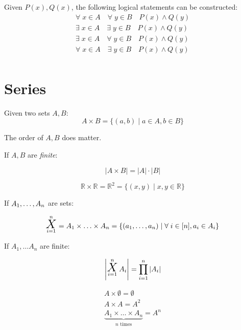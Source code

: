 \documentclass[00_complete]{subfiles}
\begin{document}
Given $P(x), Q(x)$, the following logical statements can be constructed:
\begin{gather*}
    \forall \; x \in A \quad \forall \; y \in B \quad P(x) \land Q(y) \\
    \exists \; x \in A \quad \exists \; y \in B \quad P(x) \land Q(y) \\
    \exists \; x \in A \quad \forall \; y \in B \quad P(x) \land Q(y) \\
    \forall \; x \in A \quad \exists \; y \in B \quad P(x) \land Q(y) \\
\end{gather*}

\section{Series}

\begin{definition}
Given two sets $A,B$:
$$A \times B = \{(a,b) \mid a \in A, b \in B\}$$
\begin{note}
The order of $A, B$ does matter.
\end{note}
\end{definition}

If $A, B$ are \emph{finite}:

$$|A \times B| = |A| \cdot |B|$$

\begin{definition}[Plane]
$$\mathbb{R} \times \mathbb{R} = \mathbb{R}^2 = \{(x,y) \mid x, y \in \mathbb{R}\}$$
\end{definition}

If $A_1, \mathellipsis, A_n$ are sets:

$$\X_{i=1}^n = A_1 \times \mathellipsis \times A_n = \{(a_1, \mathellipsis,
a_n) \mid \forall \; i \in [n], a_i \in A_i\}$$

If $A_1, \ldots A_n$ are finite:

$$\left|\X_{i=1}^n A_i\right| = \prod_{i=1}^n |A_i|$$

\begin{definition}[Characteristics]
\begin{gather*}
    A \times \emptyset = \emptyset \\
    A \times A = A^2 \\
    \underbrace{A_1 \times \ldots \times A_n}_{n\text{ times}} = A^n
\end{gather*}
\end{definition}
\end{document}
